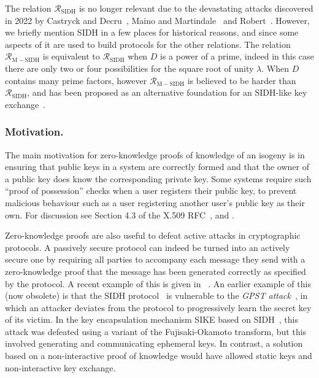 \documentclass{llncs}
\newcommand{\R}[1][]{\ensuremath{\mathcal{R}_{\mathrm{#1}}}}
\begin{document}
The relation \R[SIDH] is no longer relevant due to the devastating attacks discovered in 2022 by Castryck and Decru~\cite{CD22}, Maino and Martindale~\cite{MM22} and Robert~\cite{Rob22}. However, we briefly mention SIDH in a few places for historical reasons, and since some aspects of it are used to build protocols for the other relations. The relation \R[M-SIDH] is equivalent to \R[SIDH] when $D$ is a power of a prime, indeed in this case there are only two or four possibilities for the square root of unity $\lambda$. When $D$ contains many prime factors, however \R[M-SIDH] is believed to be harder than \R[SIDH], and has been proposed as an alternative foundation for an SIDH-like key exchange~\cite{cryptoeprint:2023/013}.





\subsubsection{Motivation.}
%
The main motivation for zero-knowledge proofs of knowledge of an isogeny is in ensuring that public keys in a system are correctly formed and that the owner of a public key does know the corresponding private key. Some systems require such ``proof of possession'' checks when a user registers their public key, to prevent malicious behaviour such as a user registering another user's public key as their own. For discussion see Section 4.3 of the X.509 RFC~\cite{X509}, and \cite{BFPW07}. 


Zero-knowledge proofs are also useful to defeat active attacks in cryptographic protocols. A passively secure protocol can indeed be turned into an actively secure one by requiring all parties to accompany each message they send with a zero-knowledge proof that the message has been generated correctly as specified by the protocol.
%
A recent example of this is given in ~\cite{cryptoeprint:2022/1469}.
An earlier example of this (now obsolete) is that the SIDH protocol~\cite{DFJP14} is vulnerable to the \emph{GPST attack}~\cite{GPST16}, in which an attacker deviates from the protocol to progressively learn the secret key of its victim. 
In the key encapsulation mechanism SIKE based on SIDH~\cite{sike2017}, this attack was defeated using a variant of the Fujisaki-Okamoto transform, but this involved generating and communicating ephemeral keys. In contrast, a solution based on a non-interactive proof of knowledge would have allowed static keys and non-interactive key exchange.
\end{document}
